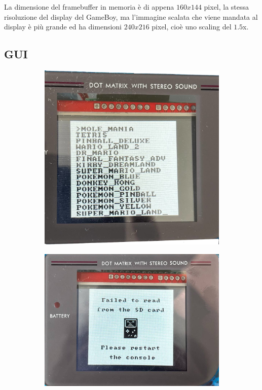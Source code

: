 \documentclass[hidelinks,12pt]{article}
\begin{document}
La dimensione del framebuffer in memoria è di appena $160x144$ pixel, la
stessa risoluzione del display del GameBoy, ma l'immagine scalata che viene
mandata al display è più grande ed ha dimensioni $240x216$ pixel, cioè uno
scaling del $1.5$x.

\subsection{GUI}
\begin{figure}[h]
	\begin{center}
		\begin{subfigure}[b]{0.4\textwidth}
			\begin{center}
				\includegraphics[scale=0.65]{figures/game_choice_gui.png}
			\end{center}
			\caption{}
			\label{fig:gui_choice}
		\end{subfigure}
		\hfill
		\begin{subfigure}[b]{0.4\textwidth}
			\begin{center}
				\includegraphics[scale=0.2]{figures/error_gui.png}

\end{center}
\end{subfigure}
\end{center}
\end{figure}
\end{document}
